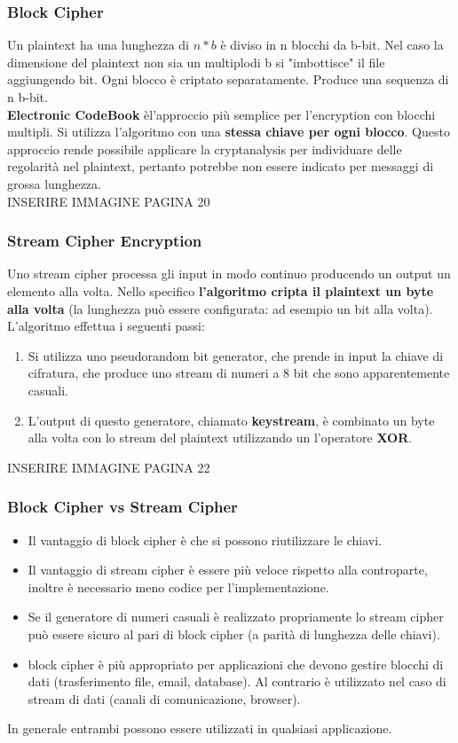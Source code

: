 \documentclass[12pt]{article}
\begin{document}
	\subsubsection{Block Cipher}
		Un plaintext ha una lunghezza di $n*b$ è diviso in n blocchi da b-bit. Nel caso la dimensione del plaintext non sia un multiplodi b si "imbottisce" il file aggiungendo bit. Ogni blocco è criptato separatamente. Produce una sequenza di n b-bit. \\
		\textbf{Electronic CodeBook} èl'approccio più semplice per l'encryption con blocchi multipli. Si utilizza l'algoritmo con una \textbf{stessa chiave per ogni blocco}. Questo approccio rende possibile applicare la cryptanalysis per individuare delle regolarità nel plaintext, pertanto potrebbe non essere indicato per messaggi di grossa lunghezza. \\
		INSERIRE IMMAGINE PAGINA 20\\
	\subsubsection{Stream Cipher Encryption}
		Uno stream cipher processa gli input in modo continuo producendo un output un elemento alla volta. Nello specifico \textbf{l'algoritmo cripta il plaintext un byte alla volta} (la lunghezza può essere configurata: ad esempio un bit alla volta). L'algoritmo effettua i seguenti passi:
		\begin{enumerate}
			\item Si utilizza uno pseudorandom bit generator, che prende in input la chiave di cifratura, che produce uno stream di numeri a 8 bit che sono apparentemente casuali.
			\item L'output di questo generatore, chiamato \textbf{keystream}, è combinato un byte alla volta con lo stream del plaintext utilizzando un l'operatore \textbf{XOR}.
		\end{enumerate}
		INSERIRE IMMAGINE PAGINA 22\\
	\subsubsection{Block Cipher vs Stream Cipher}
		\begin{itemize}
			\item Il vantaggio di block cipher è che si possono riutilizzare le chiavi.
			\item Il vantaggio di stream cipher è essere più veloce rispetto alla controparte, inoltre è necessario meno codice per l'implementazione.
			\item Se il generatore di numeri casuali è realizzato propriamente lo stream cipher può essere sicuro al pari di block cipher (a parità di lunghezza delle chiavi).
			\item block cipher è più appropriato per applicazioni che devono gestire blocchi di dati (trasferimento file, email, database). Al contrario è utilizzato nel caso di stream di dati (canali di comunicazione, browser).
		\end{itemize}
		In generale entrambi possono essere utilizzati in qualsiasi applicazione.
\end{document}
